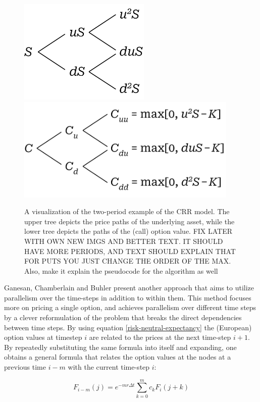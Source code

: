 \documentclass[english,12pt,a4paper,pdftex,sci,utf8]{aaltothesis}
\begin{document}
\begin{figure}[h]
    \centering
    \includegraphics[height=5cm]{two-period-stock.png}
    \includegraphics[height=5cm]{two-period-option.png}
    \caption{A visualization of the two-period example of the CRR model. The upper tree depicts the price paths of the underlying asset, while the lower tree depicts the paths of the (call) option value. FIX LATER WITH OWN NEW IMGS AND BETTER TEXT. IT SHOULD HAVE MORE PERIODS, AND TEXT SHOULD EXPLAIN THAT FOR PUTS YOU JUST CHANGE THE ORDER OF THE MAX. Also, make it explain the pseudocode for the algorithm as well}
    \label{fig:combined}
\end{figure}

Ganesan, Chamberlain and Buhler \cite{ganesan2009acceleration} present another approach that aims to utilize parallelism over the time-steps in addition to within them. This method focuses more on pricing a single option, and achieves parallelism over different time steps by a clever reformulation of the problem that breaks the direct dependencies between time steps. By using equation \eqref{risk-neutral-expectancy} the (European) option values at timestep $i$ are related to the prices at the next time-step $i+1$. By repeatedly substituting the same formula into itself and expanding, one obtains a general formula that relates the option values at the nodes at a previous time $i-m$ with the current time-step $i$:

\begin{equation}
    F_{i-m}(j) = e^{-m r \Delta t} \sum_{k=0}^m c_k F_i(j+k)
\label{relative-prices}
\end{equation}
\end{document}
